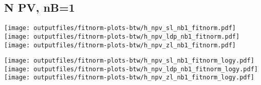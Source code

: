 \documentclass[11pt]{article}
\begin{document}
    \subsection{ N PV, nB=1 }

    \noindent
     \texttt{[image: outputfiles/fitnorm-plots-btw/h\_npv\_sl\_nb1\_fitnorm.pdf]}
     \texttt{[image: outputfiles/fitnorm-plots-btw/h\_npv\_ldp\_nb1\_fitnorm.pdf]}
     \texttt{[image: outputfiles/fitnorm-plots-btw/h\_npv\_zl\_nb1\_fitnorm.pdf]}

    \noindent
     \texttt{[image: outputfiles/fitnorm-plots-btw/h\_npv\_sl\_nb1\_fitnorm\_logy.pdf]}
     \texttt{[image: outputfiles/fitnorm-plots-btw/h\_npv\_ldp\_nb1\_fitnorm\_logy.pdf]}
     \texttt{[image: outputfiles/fitnorm-plots-btw/h\_npv\_zl\_nb1\_fitnorm\_logy.pdf]}





  
\end{document}
